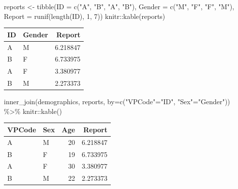 \documentclass[
]{book}
\newenvironment{Shaded}{\begin{snugshade}}{\end{snugshade}}
\newcommand{\AttributeTok}[1]{\textcolor[rgb]{0.77,0.63,0.00}{#1}}
\newcommand{\DecValTok}[1]{\textcolor[rgb]{0.00,0.00,0.81}{#1}}
\newcommand{\FunctionTok}[1]{\textcolor[rgb]{0.00,0.00,0.00}{#1}}
\newcommand{\NormalTok}[1]{#1}
\newcommand{\OtherTok}[1]{\textcolor[rgb]{0.56,0.35,0.01}{#1}}
\newcommand{\SpecialCharTok}[1]{\textcolor[rgb]{0.00,0.00,0.00}{#1}}
\newcommand{\StringTok}[1]{\textcolor[rgb]{0.31,0.60,0.02}{#1}}
\begin{document}
\begin{Shaded}
\begin{Highlighting}[]
\NormalTok{reports }\OtherTok{\textless{}{-}} \FunctionTok{tibble}\NormalTok{(}\AttributeTok{ID =} \FunctionTok{c}\NormalTok{(}\StringTok{"A"}\NormalTok{, }\StringTok{"B"}\NormalTok{, }\StringTok{"A"}\NormalTok{, }\StringTok{"B"}\NormalTok{),}
                  \AttributeTok{Gender =} \FunctionTok{c}\NormalTok{(}\StringTok{"M"}\NormalTok{, }\StringTok{"F"}\NormalTok{, }\StringTok{"F"}\NormalTok{, }\StringTok{"M"}\NormalTok{),}
                  \AttributeTok{Report =} \FunctionTok{runif}\NormalTok{(}\FunctionTok{length}\NormalTok{(ID), }\DecValTok{1}\NormalTok{, }\DecValTok{7}\NormalTok{))}
\NormalTok{knitr}\SpecialCharTok{::}\FunctionTok{kable}\NormalTok{(reports)}
\end{Highlighting}
\end{Shaded}

\begin{tabular}{l|l|r}
\hline
ID & Gender & Report\\
\hline
A & M & 6.218847\\
\hline
B & F & 6.733975\\
\hline
A & F & 3.380977\\
\hline
B & M & 2.273373\\
\hline
\end{tabular}

\begin{Shaded}
\begin{Highlighting}[]
\FunctionTok{inner\_join}\NormalTok{(demographics, reports, }\AttributeTok{by=}\FunctionTok{c}\NormalTok{(}\StringTok{"VPCode"}\OtherTok{=}\StringTok{"ID"}\NormalTok{, }\StringTok{"Sex"}\OtherTok{=}\StringTok{"Gender"}\NormalTok{)) }\SpecialCharTok{\%\textgreater{}\%}
\NormalTok{  knitr}\SpecialCharTok{::}\FunctionTok{kable}\NormalTok{()}
\end{Highlighting}
\end{Shaded}

\begin{tabular}{l|l|r|r}
\hline
VPCode & Sex & Age & Report\\
\hline
A & M & 20 & 6.218847\\
\hline
B & F & 19 & 6.733975\\
\hline
A & F & 30 & 3.380977\\
\hline
B & M & 22 & 2.273373\\
\hline
\end{tabular}
\end{document}
